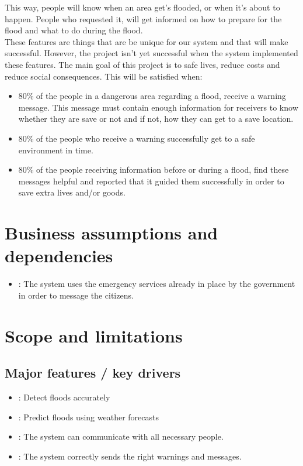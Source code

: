 This way, people will know when an area get's flooded, or when it's about to happen. People who requested it, will get informed on how to prepare for the flood and what to do during the flood.\\
These features are things that are be unique for our system and that will make successful. However, the project isn't yet successful when the system implemented these features. The main goal of this project is to safe lives, reduce costs and reduce social consequences. This will be satisfied when:
\begin{itemize}
	\item 80\% of the people in a dangerous area regarding a flood, receive a warning message. This message must contain enough information for receivers to know whether they are save or not and if not, how they can get to a save location.
	\item 80\% of the people who receive a warning successfully get to a safe environment in time.
	\item 80\% of the people receiving information before or during a flood, find these messages helpful and reported that it guided them successfully in order to save extra lives and/or goods.
\end{itemize}

\section{Business assumptions and dependencies}
\begin{itemize}
	\item {}: The system uses the emergency services already in place by the government in order to message the citizens.
	
\end{itemize}

\section{Scope and limitations}
\subsection{Major features / key drivers}
\begin{itemize}
	\item {}: Detect floods accurately
	\item {}: Predict floods using weather forecasts
	\item {}: The system can communicate with all necessary people.
	\item {}: The system correctly sends the right warnings and messages.
		
\end{itemize}
